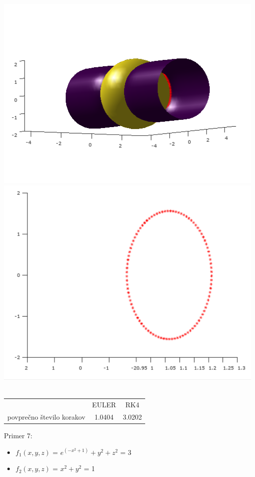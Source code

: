 \documentclass[]{article}
\begin{document}
	\includegraphics[scale=0.3]{primer6_3}
	\includegraphics[scale=0.3]{primer6_4} \\ \\
	\begin{center}
	\begin{tabular}{ |c|c|c| } 
 		\hline
 			 & EULER & RK4 \\ 
			povprečno število korakov & 1.0404 & 3.0202 \\ 
 		\hline
 	\end{tabular}
	\end{center}
	Primer 7:
	\begin{itemize}  
		\item $f_{1}(x,y,z)$ = $e^{(-x^{2}+1)}+y^{2}+z^{2}$ = 3
		\item $f_{2}(x,y,z)$ =  $x^2 + y^2$ = 1
	\end{itemize}
\end{document}
